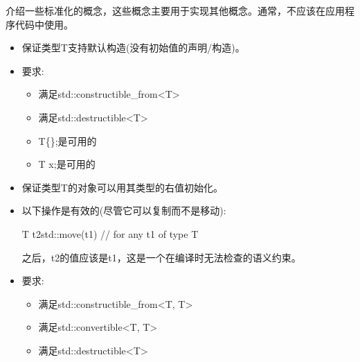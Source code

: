 

介绍一些标准化的概念，这些概念主要用于实现其他概念。通常，不应该在应用程序代码中使用。



\begin{itemize}
\item
保证类型T支持默认构造(没有初始值的声明/构造)。

\item
要求:
\begin{itemize}
\item
满足std::constructible\_from<T>

\item
满足std::destructible<T>
\item
T\{\};是可用的

\item
T x;是可用的
\end{itemize}
\end{itemize}


\begin{itemize}
\item
保证类型T的对象可以用其类型的右值初始化。

\item
以下操作是有效的(尽管它可以复制而不是移动):

\begin{cpp}
T t2{std::move(t1)} // for any t1 of type T
\end{cpp}

之后，t2的值应该是t1，这是一个在编译时无法检查的语义约束。

\item
要求:
\begin{itemize}
\item
满足std::constructible\_from<T, T>

\item
满足std::convertible<T, T>

\item
满足std::destructible<T>
\end{itemize}
\end{itemize}


